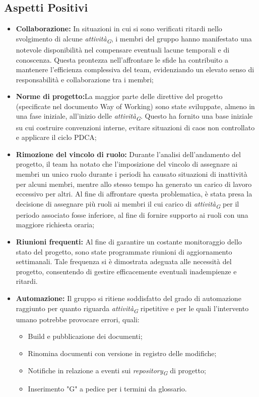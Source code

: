 \subsection{Aspetti Positivi}
\begin{itemize}
    \item \textbf{Collaborazione:} In situazioni in cui si sono verificati ritardi nello svolgimento di alcune \textit{attività}\textsubscript{\textit{G}}, i membri del gruppo hanno manifestato una notevole disponibilità nel compensare eventuali lacune temporali e di conoscenza. Questa prontezza nell'affrontare le sfide ha contribuito a mantenere l'efficienza complessiva del team, evidenziando un elevato senso di responsabilità e collaborazione tra i membri;
    \item \textbf{Norme di progetto:}La maggior parte delle direttive del progetto (specificate nel documento Way of Working) sono state sviluppate, almeno in una fase iniziale, all'inizio delle \textit{attività}\textsubscript{\textit{G}}. Questo ha fornito una base iniziale su cui costruire convenzioni interne, evitare situazioni di caos non controllato e applicare il ciclo PDCA;
    \item \textbf{Rimozione del vincolo di ruolo:} Durante l'analisi dell'andamento del progetto, il team ha notato che l'imposizione del vincolo di assegnare ai membri un unico ruolo durante i periodi ha causato situazioni di inattività per alcuni membri, mentre allo stesso tempo ha generato un carico di lavoro eccessivo per altri.
    Al fine di affrontare questa problematica, è stata presa la decisione di assegnare più ruoli ai membri il cui carico di \textit{attività}\textsubscript{\textit{G}} per il periodo associato fosse inferiore, al fine di fornire supporto ai ruoli con una maggiore richiesta oraria;
    \item \textbf{Riunioni frequenti:} Al fine di garantire un costante monitoraggio dello stato del progetto, sono state programmate riunioni di aggiornamento settimanali. Tale frequenza si è dimostrata adeguata alle necessità del progetto, consentendo di gestire efficacemente eventuali inadempienze e ritardi.
    \item \textbf{Automazione:} Il gruppo si ritiene soddisfatto del grado di automazione raggiunto per quanto riguarda \textit{attività}\textsubscript{\textit{G}} ripetitive e per le quali l'intervento umano potrebbe provocare errori, quali:
    \begin{itemize}
        \item Build e pubblicazione dei documenti;
        \item Rinomina documenti con versione in registro delle modifiche;
        \item Notifiche in relazione a eventi sui \textit{repository}\textsubscript{\textit{G}} di progetto;
        \item Inserimento "G" a pedice per i termini da glossario.
    \end{itemize}
\end{itemize}